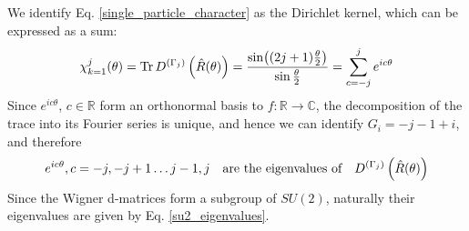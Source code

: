 \documentclass[12pt]{article}
\begin{document}
	We identify Eq. \ref{single_particle_character} as the Dirichlet kernel, which can be expressed as a sum:
	\begin{equation} \label{dirichlet_kernel_sum}
	\chi^j_{k=1}(\theta)=\Tr D^{(\Gamma_j)}\left(\hat{R}(\theta)\right)=\frac{\sin((2j+1)\frac{\theta}{2})}{\sin{\frac{\theta}{2}}}=\sum_{c=-j}^j e^{ic\theta}
	\end{equation}
	Since $e^{ic\theta}$, $c\in \mathbb{R}$ form an orthonormal basis to $f:\mathbb{R}\to\mathbb{C}$, the decomposition of the trace into its Fourier series is unique, and hence we can identify $G_i=-j-1+i$, and therefore
	\begin{equation} \label{su2_eigenvalues}
	e^{ic\theta}, c=-j,-j+1\dots j-1, j \qq{are the eigenvalues of} D^{(\Gamma_j)}\left(\hat{R}(\theta)\right)
	\end{equation}
	Since the Wigner d-matrices form a subgroup of $SU(2)$, naturally their eigenvalues are given by Eq. \ref{su2_eigenvalues}.
	
\end{document}
